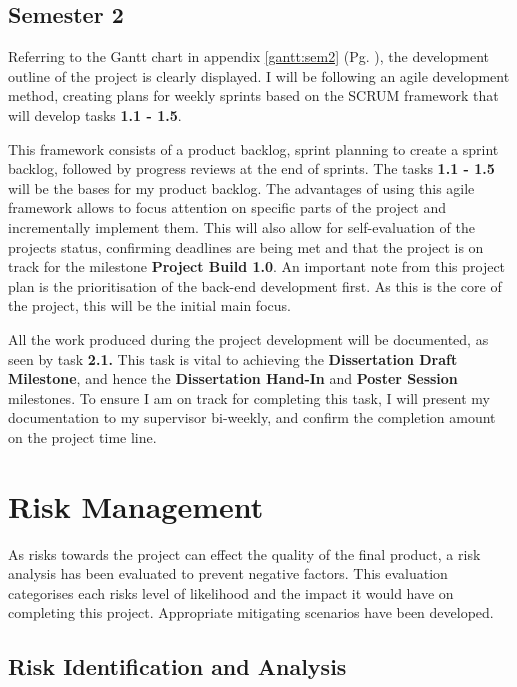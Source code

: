\subsection{Semester 2}
\label{sec:management:pp:sem2}

\noindent Referring to the Gantt chart in appendix \ref{gantt:sem2} (Pg. \pageref{gantt:sem2}), the development outline of the project is clearly displayed. I will be following an agile development method, creating plans for weekly sprints based on the SCRUM framework that will develop tasks \textbf{1.1 - 1.5}. 

This framework consists of a product backlog, sprint planning to create a sprint backlog, followed by progress reviews at the end of sprints. The tasks \textbf{1.1 - 1.5} will be the bases for my product backlog. The advantages of using this agile framework allows to focus attention on specific parts of the project and incrementally implement them. This will also allow for self-evaluation of the projects status, confirming deadlines are being met and that the project is on track for the milestone \textbf{Project Build 1.0}. An important note from this project plan is the prioritisation of the back-end development first. As this is the core of the project, this will be the initial main focus.

All the work produced during the project development will be documented, as seen by task \textbf{2.1.} This task is vital to achieving the \textbf{Dissertation Draft Milestone}, and hence the \textbf{Dissertation Hand-In} and \textbf{Poster Session} milestones. To ensure I am on track for completing this task, I will present my documentation to my supervisor bi-weekly, and confirm the completion amount on the project time line. 


\section{Risk Management}
\label{sec:management:ra}

\noindent As risks towards the project can effect the quality of the final product, a risk analysis has been evaluated to prevent negative factors. This evaluation categorises each risks level of likelihood and the impact it would have on completing this project. Appropriate mitigating scenarios have been developed.

\subsection{Risk Identification and Analysis}

